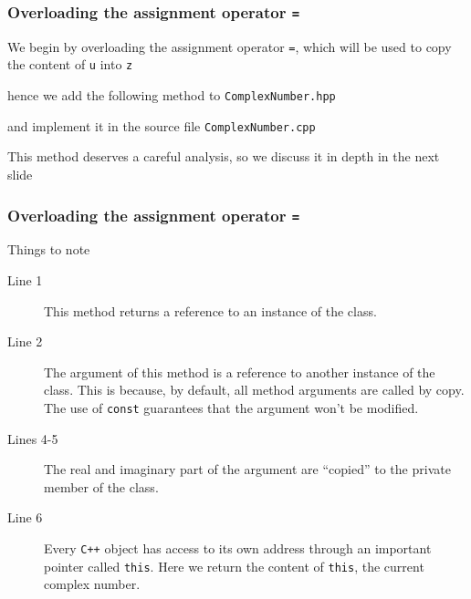 \documentclass[8pt, compress]{beamer}
\def\inline{\lstinline[basicstyle=\ttfamily,keywordstyle={},directivestyle={}]}
\begin{document}
\begin{frame}[fragile]
  \frametitle{Overloading the assignment operator \inline|=|}

  We begin by overloading the assignment operator \inline|=|, which will be used to
  copy the content of \inline|u| into \inline|z|
   

  hence we add the following method to \inline|ComplexNumber.hpp|
   

  and implement it in the source file \inline|ComplexNumber.cpp|
   

  This method deserves a careful analysis, so we discuss it in depth in the next
  slide
\end{frame}

\begin{frame}[fragile]
  \frametitle{Overloading the assignment operator \inline|=|}
  \vspace{-1em}
   
  \begin{alertblock}{Things to note}
    \begin{description}
      \item[Line 1] This method returns a reference to an instance of the class.
      \item[Line 2] The argument of this method is a \alert{reference} to
	another instance of the class. This is because, by default, all method
	arguments are called by copy. The use of \inline|const| guarantees that
	the argument won't be modified.
      \item[Lines 4-5] The real and imaginary part of the argument are
	``copied'' to the private member of the class.
      \item[Line 6] Every \inline|C++| object has access to its own address
	through an important pointer called \inline|this|. Here we return the
	content of \inline|this|, the current complex number.
    \end{description}
  \end{alertblock}

\end{frame}
\end{document}
